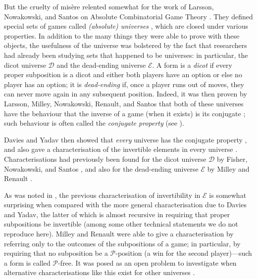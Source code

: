 \documentclass[11pt]{article}
\theoremstyle{definition}
\newcommand{\set}[1]{\mathcal{#1}}
\begin{document}
But the cruelty of mis\`ere relented somewhat for the work of Larsson,
Nowakowski, and Santos on Absolute Combinatorial Game Theory
\cite{larsson.nowakowski.ea:absolute}. They defined special sets of games
called \emph{(absolute) universes} \cite[Definition 23 on
p.~117]{larsson.nowakowski.ea:absolute}, which are closed under various
properties. In addition to the many things they were able to prove with these
objects, the usefulness of the universe was bolstered by the fact that
researchers had already been studying sets that happened to be universes: in
particular, the dicot universe $\set{D}$ and the dead-ending universe
$\set{E}$. A form is a \emph{dicot} if every proper subposition is a dicot and
either both players have an option or else no player has an option; it is
\emph{dead-ending} if, once a player runs out of moves, they can never move
again in any subsequent position. Indeed, it was then proven by Larsson,
Milley, Nowakowski, Renault, and Santos that both of these universes have the
behaviour that the inverse of a game (when it exists) is its conjugate
\cite[Theorems 25 and 27 on pp.~262--263]{larsson.milley.ea:reversibility};
such behaviour is often called the \emph{conjugate property} (see
\cite[Definition 2 on p.~248]{larsson.milley.ea:reversibility}).

Davies and Yadav then showed that \emph{every} universe has the conjugate
property \cite[Theorem 3.7 on p.~11]{davies.yadav:invertibility}, and also gave
a characterisation of the invertible elements in every universe \cite[Theorem
3.8 on p.~13]{davies.yadav:invertibility}. Characterisations had previously
been found for the dicot universe $\set{D}$ by Fisher, Nowakowski, and Santos
\cite[Theorem 12 on p.~7]{fisher.nowakowski.ea:invertible}, and also for the
dead-ending universe $\set{E}$ by Milley and Renault \cite[Theorems 19 and 22
on pp.~11--12]{milley.renault:invertible}.

As was noted in \cite[p.~14]{davies.yadav:invertibility}, the previous
characterisation of invertibility in $\set{E}$ is somewhat surprising when
compared with the more general characterisation due to Davies and Yadav, the
latter of which is almost recursive in requiring that proper subpositions be
invertible (among some other technical statements we do not reproduce here).
Milley and Renault were able to give a characterisation by referring only to
the outcomes of the subpositions of a game; in particular, by requiring that no
subposition be a $\mathscr{P}$-position (a win for the second player)---such a
form is called $\mathscr{P}$-free. It was posed as an open problem to
investigate when alternative characterisations like this exist for other
universes \cite[Open problem 3.11 on p.~14]{davies.yadav:invertibility}.
\end{document}
